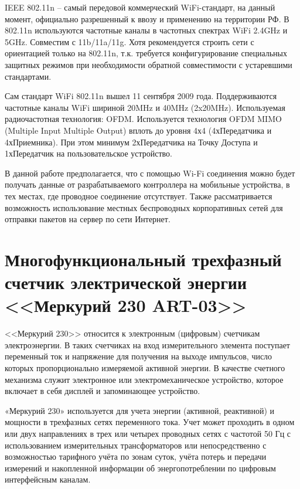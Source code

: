 IEEE 802.11n – самый передовой коммерческий WiFi-стандарт, на данный момент, официально разрешенный к ввозу и применению на территории РФ. В 802.11n используются частотные каналы в частотных спектрах WiFi 2.4GHz и 5GHz. Совместим с 11b/11a/11g. Хотя рекомендуется строить сети с ориентацией только на 802.11n, т.к. требуется конфигурирование специальных защитных режимов при необходимости обратной совместимости с устаревшими стандартами\cite{wifistandarts}.

Сам стандарт WiFi 802.11n вышел 11 сентября 2009 года.
Поддерживаются частотные каналы WiFi шириной 20MHz и 40MHz (2x20MHz).
Используемая радиочастотная технология: OFDM.
Используется технология OFDM MIMO (Multiple Input Multiple Output) вплоть до уровня 4х4 (4хПередатчика и 4хПриемника). При этом минимум 2хПередатчика на Точку Доступа и 1хПередатчик на пользовательское устройство.

В данной работе предполагается, что с помощью Wi-Fi соединения можно будет получать данные от разрабатываемого контроллера на мобильные устройства, в тех местах, где проводное соединение отсутствует. Также рассматривается возможность использование местных беспроводных корпоративных сетей для отправки пакетов на сервер по сети Интернет.

\newpage

\section{Многофункциональный трехфазный счетчик электрической энергии <<Меркурий 230 ART-03>>}

<<Меркурий 230>> относится к электронным (цифровым) счетчикам электроэнергии. В таких счетчиках на вход измерительного элемента поступает переменный ток и напряжение для получения на выходе импульсов, число которых пропорционально измеряемой активной энергии. В качестве счетного механизма служит электронное или электромеханическое устройство, которое включает в себя дисплей и запоминающее устройство\cite{mercinfo1}. 

«Меркурий 230» используется для учета энергии (активной, реактивной) и мощности в трехфазных сетях переменного тока. Учет может проходить в одном или двух направлениях в трех или четырех проводных сетях с частотой 50 Гц с использованием измерительных трансформаторов или непосредственно с возможностью тарифного учёта по зонам суток, учёта потерь и передачи измерений и накопленной информации об энергопотреблении по цифровым интерфейсным каналам\cite{mercinfo2}.

